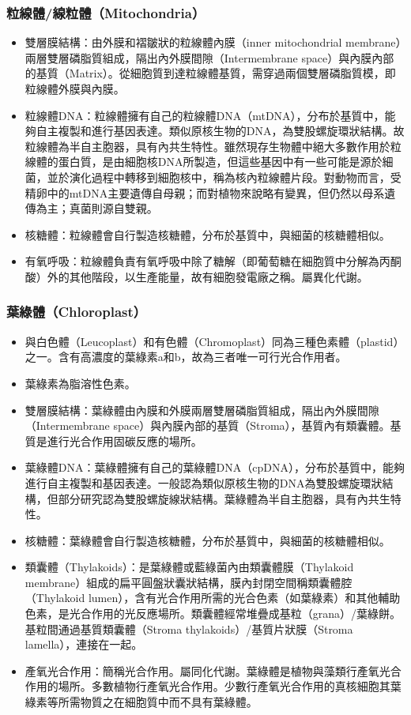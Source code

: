 \documentclass[a4paper,12pt]{report}
\begin{document}
\subsubsection{粒線體/線粒體（Mitochondria）}
\begin{itemize}
  \item 雙層膜結構：由外膜和褶皺狀的粒線體內膜（inner mitochondrial membrane）兩層雙層磷脂質組成，隔出內外膜間隙（Intermembrane space）與內膜內部的基質（Matrix）。從細胞質到達粒線體基質，需穿過兩個雙層磷脂質模，即粒線體外膜與內膜。
  \item 粒線體DNA：粒線體擁有自己的粒線體DNA（mtDNA），分布於基質中，能夠自主複製和進行基因表達。類似原核生物的DNA，為雙股螺旋環狀結構。故粒線體為半自主胞器，具有內共生特性。雖然現存生物體中絕大多數作用於粒線體的蛋白質，是由細胞核DNA所製造，但這些基因中有一些可能是源於細菌，並於演化過程中轉移到細胞核中，稱為核內粒線體片段。對動物而言，受精卵中的mtDNA主要遺傳自母親；而對植物來說略有變異，但仍然以母系遺傳為主；真菌則源自雙親。
  \item 核糖體：粒線體會自行製造核糖體，分布於基質中，與細菌的核糖體相似。
  \item 有氧呼吸：粒線體負責有氧呼吸中除了糖解（即葡萄糖在細胞質中分解為丙酮酸）外的其他階段，以生產能量，故有細胞發電廠之稱。屬異化代謝。
  \end{itemize}
\subsubsection{葉綠體（Chloroplast）}
\begin{itemize}
  \item 與白色體（Leucoplast）和有色體（Chromoplast）同為三種色素體（plastid）之一。含有高濃度的葉綠素a和b，故為三者唯一可行光合作用者。
  \item 葉綠素為脂溶性色素。
  \item 雙層膜結構：葉綠體由內膜和外膜兩層雙層磷脂質組成，隔出內外膜間隙（Intermembrane space）與內膜內部的基質（Stroma），基質內有類囊體。基質是進行光合作用固碳反應的場所。
  \item 葉綠體DNA：葉綠體擁有自己的葉綠體DNA（cpDNA），分布於基質中，能夠進行自主複製和基因表達。一般認為類似原核生物的DNA為雙股螺旋環狀結構，但部分研究認為雙股螺旋線狀結構。葉綠體為半自主胞器，具有內共生特性。
  \item 核糖體：葉綠體會自行製造核糖體，分布於基質中，與細菌的核糖體相似。
  \item 類囊體（Thylakoids）：是葉綠體或藍綠菌內由類囊體膜（Thylakoid membrane）組成的扁平圓盤狀囊狀結構，膜內封閉空間稱類囊體腔（Thylakoid lumen），含有光合作用所需的光合色素（如葉綠素）和其他輔助色素，是光合作用的光反應場所。類囊體經常堆疊成基粒（grana）/葉綠餅。基粒間通過基質類囊體（Stroma thylakoids）/基質片狀膜（Stroma lamella），連接在一起。
  \item 產氧光合作用：簡稱光合作用。屬同化代謝。葉綠體是植物與藻類行產氧光合作用的場所。多數植物行產氧光合作用。少數行產氧光合作用的真核細胞其葉綠素等所需物質之在細胞質中而不具有葉綠體。
  \end{itemize}
\end{document}
